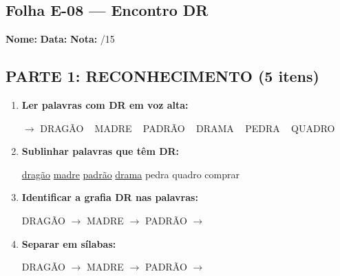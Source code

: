 \subsection{Folha E-08 --- Encontro DR}
\begin{exercicio}



\noindent\textbf{Nome:} \underline{\hspace{3.2cm}} \quad \textbf{Data:} \underline{\hspace{1.6cm}} \quad \textbf{Nota:} \underline{\hspace{0.9cm}}/15


\subsection*{PARTE 1: RECONHECIMENTO (5 itens)}

\begin{enumerate}

  \item \textbf{Ler palavras com DR em voz alta:}
  \begin{center}
  $\rightarrow$ DRAGÃO ~ MADRE ~ PADRÃO ~ DRAMA ~ PEDRA ~ QUADRO
  \end{center}

  \item \textbf{Sublinhar palavras que têm DR:}

\begin{center}
  \uline{dragão} \quad \uline{madre} \quad \uline{padrão} \quad \uline{drama} \quad pedra \quad quadro \quad comprar
\end{center}

  \item \textbf{Identificar a grafia DR nas palavras:}
  \begin{center}
  DRAGÃO $\rightarrow$ \underline{\hspace{1cm}} \quad MADRE $\rightarrow$ \underline{\hspace{1cm}} \quad PADRÃO $\rightarrow$ \underline{\hspace{1cm}}
  \end{center}

  \item \textbf{Separar em sílabas:}
  \begin{center}
  DRAGÃO $\rightarrow$ \underline{\hspace{1.2cm}} \quad MADRE $\rightarrow$ \underline{\hspace{1.2cm}} \quad PADRÃO $\rightarrow$ \underline{\hspace{1.2cm}}
  \end{center}


\end{enumerate}
\end{exercicio}
